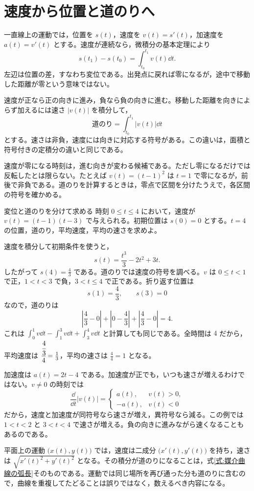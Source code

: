 \section{速度から位置と道のりへ}\label{節:運動と積分}

一直線上の運動では，位置を $s(t)$，速度を $v(t)=s'(t)$，加速度を $a(t)=v'(t)$ とする。速度が連続なら，微積分の基本定理により
\[
s(t_1)-s(t_0)=\int_{t_0}^{t_1}v(t)\dd t.
\]
左辺は位置の差，すなわち変位である。出発点に戻れば零になるが，途中で移動した距離が零という意味ではない。

速度が正なら正の向きに進み，負なら負の向きに進む。移動した距離を向きによらず加えるには速さ $|v(t)|$ を積分して，
\begin{equation}\label{式:道のり}
\text{道のり}=\int_{t_0}^{t_1}|v(t)|\dd t
\end{equation}
とする。速さは非負，速度には向きに対応する符号がある。この違いは，面積と符号付きの定積分の違いと同じである。

速度が零になる時刻は，進む向きが変わる候補である。ただし零になるだけでは反転したとは限らない。たとえば $v(t)=(t-1)^2$ は $t=1$ で零になるが，前後で非負である。道のりを計算するときは，零点で区間を分けたうえで，各区間の符号を確かめる。

\begin{example}{変位と道のりを分けて求める}
時刻 $0\leq t\leq4$ において，速度が $v(t)=(t-1)(t-3)$ で与えられる。初期位置は $s(0)=0$ とする。$t=4$ の位置，道のり，平均速度，平均の速さを求めよ。
\end{example}

速度を積分して初期条件を使うと，
\[
s(t)=\frac{t^3}{3}-2t^2+3t.
\]
したがって $s(4)=\frac43$ である。道のりでは速度の符号を調べる。$v$ は $0\leq t<1$ で正，$1<t<3$ で負，$3<t\leq4$ で正である。折り返す位置は
\[
s(1)=\frac43,\qquad s(3)=0
\]
なので，道のりは
\[
\left|\frac43-0\right|+\left|0-\frac43\right|
 +\left|\frac43-0\right|=4.
\]
これは $\int_0^1v\dd t-\int_1^3v\dd t+\int_3^4v\dd t$ と計算しても同じである。全時間は $4$ だから，平均速度は $\cfrac{\cfrac43}{4}=\frac13$，平均の速さは $\frac44=1$ となる。

加速度は $a(t)=2t-4$ である。加速度が正でも，いつも速さが増えるわけではない。$v\ne0$ の時刻では
\[
\frac{\dd}{\dd t}|v(t)|=
\begin{cases}
a(t),&v(t)>0,\\
-a(t),&v(t)<0
\end{cases}
\]
だから，速度と加速度が同符号なら速さが増え，異符号なら減る。この例では $1<t<2$ と $3<t<4$ で速さが増える。負の向きに進みながら速くなることもあるのである。

平面上の運動 $\bigl(x(t),y(t)\bigr)$ では，速度は二成分 $\bigl(x'(t),y'(t)\bigr)$ を持ち，速さは $\sqrt{x'(t)^2+y'(t)^2}$ となる。その積分が道のりになることは，式\eqref{式:媒介曲線の弧長}そのものである。運動では同じ場所を再び通った分も道のりに含むので，曲線を重複してたどることは誤りではなく，数えるべき内容になる。

